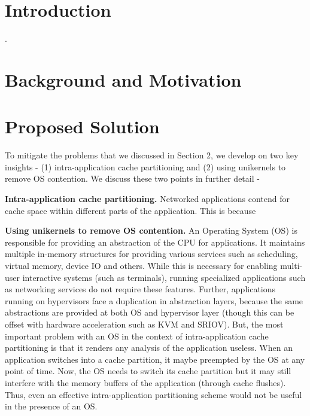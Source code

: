 \documentclass[sigconf]{acmart}
\begin{document}
\maketitle

\section{Introduction}

\cite{alireza_2020}.

\section{Background and Motivation}

\section{Proposed Solution}

To mitigate the problems that we discussed in Section 2, we develop on two key
insights - (1) intra-application cache partitioning and (2) using unikernels to
remove OS contention. We discuss these two points in further detail -

\textbf{Intra-application cache partitioning.} Networked applications contend
for cache space within different parts of the application. This is because 

\textbf{Using unikernels to remove OS contention.} An Operating System (OS) is
responsible for providing an abstraction of the CPU for applications. It
maintains multiple in-memory structures for providing various services such as
scheduling, virtual memory, device IO and others. While this is necessary for
enabling multi-user interactive systems (such as terminals), running specialized
applications such as networking services do not require these features. Further,
applications running on hypervisors face a duplication in abstraction layers,
because the same abstractions are provided at both OS and hypervisor layer
(though this can be offset with hardware acceleration such as KVM and SRIOV).
But, the most important problem with an OS in the context of intra-application
cache partitioning is that it renders any analysis of the application useless.
When an application switches into a cache partition, it maybe preempted by the
OS at any point of time. Now, the OS needs to switch its cache partition but it
may still interfere with the memory buffers of the application (through cache
flushes). Thus, even an effective intra-application partitioning scheme would
not be useful in the presence of an OS.
\end{document}
